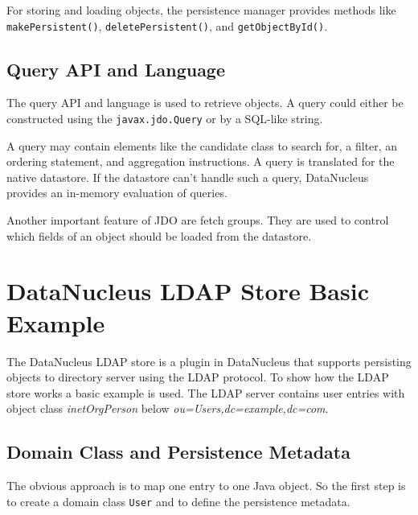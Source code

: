 \documentclass[a4paper,11pt,oneside]{article}
\begin{document}
For storing and loading objects, the persistence manager provides methods like \texttt{makePersistent()}, \texttt{deletePersistent()}, and \texttt{getObjectById()}.

\subsection{Query API and Language}
The query API and language is used to retrieve objects. A query could either be constructed using the \texttt{javax.jdo.Query} or by a SQL-like string.

A query may contain elements like the candidate class to search for, a filter, an ordering statement, and aggregation instructions. A query is translated for the native datastore. If the datastore can't handle such a query, DataNucleus provides an in-memory evaluation of queries.

Another important feature of JDO are fetch groups. They are used to control which fields of an object should be loaded from the datastore.

\newpage
\section{DataNucleus LDAP Store Basic Example}
The DataNucleus LDAP store \cite{DataNucleus LDAP} is a plugin in DataNucleus that supports persisting objects to directory server using the LDAP protocol. To show how the LDAP store works a basic example is used. The LDAP server contains user entries with object class \textit{inetOrgPerson} below \textit{ou=Users,dc=example,dc=com}. 

\subsection{Domain Class and Persistence Metadata}

The obvious approach is to map one entry to one Java object. So the first step is to create a domain class \texttt{User} and to define the persistence metadata.
\end{document}
